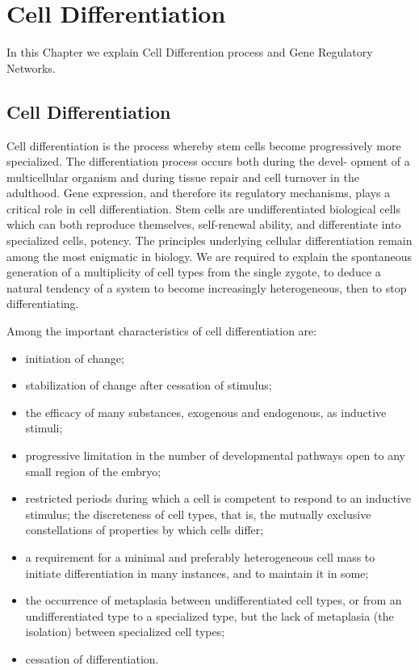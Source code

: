 \chapter{Cell Differentiation }\label{celldiff}
\lhead[\fancyplain{}{\bfseries\thepage}]{\fancyplain{}{\bfseries\rightmark}}

In this Chapter we explain Cell Differention process and Gene Regulatory Networks.

\section{Cell Differentiation}
Cell differentiation is the process whereby stem cells become progressively
more specialized. The differentiation process occurs both during the devel-
opment of a multicellular organism and during tissue repair and cell turnover
in the adulthood. Gene expression, and therefore its regulatory mechanisms,
plays a critical role in cell differentiation.
Stem cells are undifferentiated biological cells which can both reproduce
themselves, self-renewal ability, and differentiate into specialized cells, potency.
The principles underlying cellular differentiation remain among the most
enigmatic in biology. We are required to explain the spontaneous generation of a multiplicity of cell types from the single zygote, to deduce a natural
tendency of a system to become increasingly heterogeneous, then to stop
differentiating.

Among the important characteristics of cell differentiation are: 
\begin{itemize}
\item initiation
of change; 
\item stabilization of change after cessation of stimulus; 
\item the efficacy of
many substances, exogenous and endogenous, as inductive stimuli;
\item progressive limitation in the number of developmental pathways open to any small region of the embryo; 
\item restricted periods during which
a cell is competent to respond to an inductive stimulus; the discreteness of
cell types, that is, the mutually exclusive constellations of properties by
which cells differ; 
\item a requirement for a minimal and preferably heterogeneous
cell mass to initiate differentiation in many instances, and to maintain it in
some; 
\item the occurrence of metaplasia between undifferentiated cell types, or
from an undifferentiated type to a specialized type, but the lack of metaplasia
(the isolation) between specialized cell types; 
\item cessation of differentiation.
\end{itemize}

